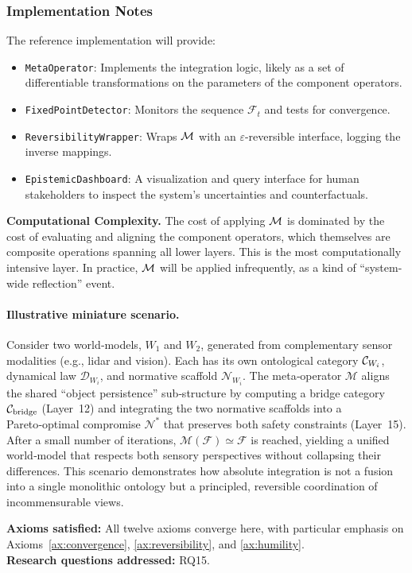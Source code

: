 \subsubsection{Implementation Notes}
The reference implementation will provide:
\begin{itemize}
    \item \texttt{MetaOperator}: Implements the integration logic, likely as a set of differentiable transformations on the parameters of the component operators.
    \item \texttt{FixedPointDetector}: Monitors the sequence $\mathcal{F}_t$ and tests for convergence.
    \item \texttt{ReversibilityWrapper}: Wraps $\mathcal{M}$ with an $\varepsilon$-reversible interface, logging the inverse mappings.
    \item \texttt{EpistemicDashboard}: A visualization and query interface for human stakeholders to inspect the system's uncertainties and counterfactuals.
\end{itemize}

\textbf{Computational Complexity.} The cost of applying $\mathcal{M}$ is dominated by the cost of evaluating and aligning the component operators, which themselves are composite operations spanning all lower layers. This is the most computationally intensive layer. In practice, $\mathcal{M}$ will be applied infrequently, as a kind of ``system-wide reflection'' event.
\paragraph{Illustrative miniature scenario.}
Consider two world‑models, $W_1$ and $W_2$, generated from
complementary sensor modalities (e.g., lidar and vision).  Each has
its own ontological category $\mathcal{C}_{W_i}$, dynamical law
$\mathcal{D}_{W_i}$, and normative scaffold $\mathcal{N}_{W_i}$.
The meta‑operator $\mathcal{M}$ aligns the shared “object persistence”
sub‑structure by computing a bridge category
$\mathcal{C}_{\text{bridge}}$ (Layer~12) and integrating the two normative
scaffolds into a Pareto‑optimal compromise $\mathcal{N}^*$ that
preserves both safety constraints (Layer~15).  After a small number
of iterations, $\mathcal{M}(\mathcal{F})\simeq\mathcal{F}$ is
reached, yielding a unified world‑model that respects both sensory
perspectives without collapsing their differences.  This scenario
demonstrates how absolute integration is not a fusion into a single
monolithic ontology but a principled, reversible coordination of
incommensurable views.

\textbf{Axioms satisfied:} All twelve axioms converge here, with particular emphasis on Axioms~\ref{ax:convergence}, \ref{ax:reversibility}, and \ref{ax:humility}. \\
\textbf{Research questions addressed:} RQ15.

\endinput